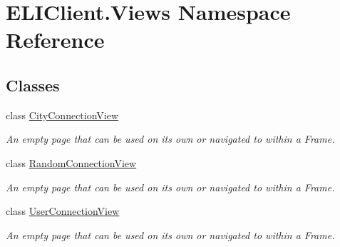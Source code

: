\hypertarget{namespace_e_l_i_client_1_1_views}{}\section{E\+L\+I\+Client.\+Views Namespace Reference}
\label{namespace_e_l_i_client_1_1_views}
\subsection*{Classes}
\begin{DoxyCompactItemize}
\item 
class \hyperlink{class_e_l_i_client_1_1_views_1_1_city_connection_view}{City\+Connection\+View}
\begin{DoxyCompactList}\small\item\em An empty page that can be used on its own or navigated to within a Frame. \end{DoxyCompactList}\item 
class \hyperlink{class_e_l_i_client_1_1_views_1_1_random_connection_view}{Random\+Connection\+View}
\begin{DoxyCompactList}\small\item\em An empty page that can be used on its own or navigated to within a Frame. \end{DoxyCompactList}\item 
class \hyperlink{class_e_l_i_client_1_1_views_1_1_user_connection_view}{User\+Connection\+View}
\begin{DoxyCompactList}\small\item\em An empty page that can be used on its own or navigated to within a Frame. \end{DoxyCompactList}\end{DoxyCompactItemize}
